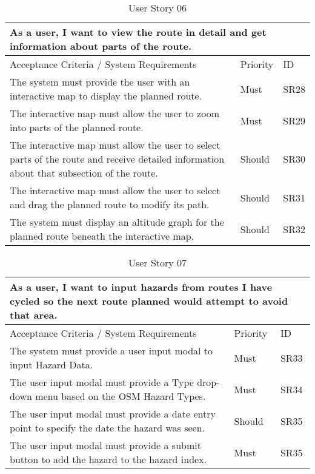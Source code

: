 \begin{table}[!htb]
\caption{User Story 06}
\label{tab:user-story-06}
\begin{tabular}{ p{8cm} p{1cm}  p{1cm} }
\hline
\multicolumn{3}{p{13cm}}{As a user, I want to view the route in detail and get information about parts of the route.}\\ 
\hline
Acceptance Criteria / System Requirements & Priority & ID\\
\hline
The system must provide the user with an interactive map to display the planned route. & Must & SR28 \\
The interactive map must allow the user to zoom into parts of the planned route. & Must & SR29\\
The interactive map must allow the user to select parts of the route and receive detailed information about that subsection of the route. & Should & SR30\\
The interactive map must allow the user to select and drag the planned route to modify its path. & Should & SR31\\ 
The system must display an altitude graph for the planned route beneath the interactive map. & Should & SR32\\ 
\hline
\end{tabular}
\end{table}

\begin{table}[!htb]
\caption{User Story 07}
\label{tab:user-story-07}
\begin{tabular}{ p{8cm} p{1cm}  p{1cm} }
\hline
\multicolumn{3}{p{13cm}}{As a user, I want to input hazards from routes I have cycled so the next route planned would attempt to avoid that area.}\\ 
\hline
Acceptance Criteria / System Requirements & Priority & ID\\
\hline
The system must provide a user input modal to input Hazard Data. & Must & SR33 \\
The user input modal must provide a Type drop-down menu based on the OSM Hazard Types. & Must & SR34\\
The user input modal must provide a date entry point to specify the date the hazard was seen. & Should & SR35\\
The user input modal must provide a submit button to add the hazard to the hazard index. & Must & SR35\\ 
\hline
\end{tabular}
\end{table}
